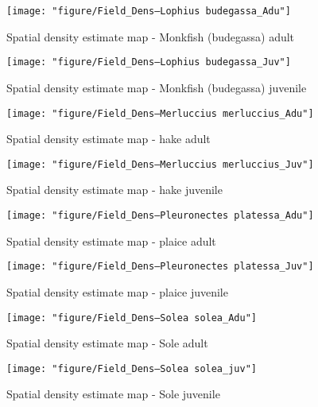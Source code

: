 \documentclass[11pt]{article}
\begin{document}
\begin{landscape}
\begin{figure}[!phtb]
	\centering
\texttt{[image: "figure/Field\_Dens--Lophius budegassa\_Adu"]}
\caption{Spatial density estimate map - Monkfish (budegassa) adult}
\label{fig:23}
\end{figure}

\begin{figure}[!phtb]
	\centering
\texttt{[image: "figure/Field\_Dens--Lophius budegassa\_Juv"]}
\caption{Spatial density estimate map - Monkfish (budegassa) juvenile}
\label{fig:24}
\end{figure}

\begin{figure}[!phtb]
	\centering
\texttt{[image: "figure/Field\_Dens--Merluccius merluccius\_Adu"]}
\caption{Spatial density estimate map - hake adult}
\label{fig:25}
\end{figure}

\begin{figure}[!phtb]
	\centering
\texttt{[image: "figure/Field\_Dens--Merluccius merluccius\_Juv"]}
\caption{Spatial density estimate map - hake juvenile}
\label{fig:26}
\end{figure}


\begin{figure}[!phtb]
	\centering
\texttt{[image: "figure/Field\_Dens--Pleuronectes platessa\_Adu"]}
\caption{Spatial density estimate map - plaice adult}
\label{fig:27}
\end{figure}

\begin{figure}[!phtb]
	\centering
\texttt{[image: "figure/Field\_Dens--Pleuronectes platessa\_Juv"]}
\caption{Spatial density estimate map - plaice juvenile}
\label{fig:28}
\end{figure}

\begin{figure}[!phtb]
	\centering
\texttt{[image: "figure/Field\_Dens--Solea solea\_Adu"]}
\caption{Spatial density estimate map - Sole adult}
\label{fig:29}
\end{figure}

\begin{figure}[!phtb]
	\centering
\texttt{[image: "figure/Field\_Dens--Solea solea\_juv"]}
\caption{Spatial density estimate map - Sole juvenile}
\label{fig:30}
\end{figure}


\end{landscape}
\end{document}
